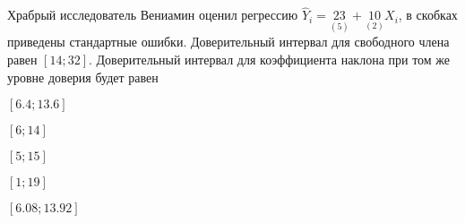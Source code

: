 
\begin{question}
Храбрый исследователь Вениамин оценил регрессию
\(\hat Y_i = \underset{(5)}{23} + \underset{(2)}{10}X_i\), в скобках
приведены стандартные ошибки. Доверительный интервал для свободного
члена равен \([14; 32]\). Доверительный интервал для коэффициента
наклона при том же уровне доверия будет равен
\begin{answerlist}
  \item \([6.4; 13.6]\)
  \item \([6; 14]\)
  \item \([5; 15]\)
  \item \([1; 19]\)
  \item \([6.08; 13.92]\)
\end{answerlist}
\end{question}



